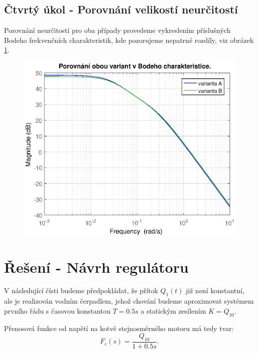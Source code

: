 \documentclass[a4paper,11pt]{article}
\begin{document}
\subsection{Čtvrtý úkol - Porovnání velikostí neurčitostí}
Porovnání neurčitostí pro oba případy provedeme vykreslením příslušných Bodeho frekvenčních charakteristik, kde pozorujeme nepatrné rozdíly, viz obrázek \ref{fig:porovnani_neurcitosti}.
\begin{figure}[htbp]
	\begin{center}
	\includegraphics[scale = 1.0]{obrazky/porovnaniNeurcitosti.eps}
	\label{fig:porovnani_neurcitosti}
	\end{center}
\end{figure}


\newpage
\section{Řešení - Návrh regulátoru}
V následující čísti budeme předpokládat, že přítok $ Q_{1}\left ( t \right ) $ již není konstantní, ale je realizován vodním čerpadlem, jehož chování budeme aproximovat systémem prvního řádu s časovou konstantou $ T=0.5s $ a statickým zesílením $ K = Q_{10} $. 

Přenosová funkce od napětí na kotvě stejnosměrného motoru má tedy tvar:
\begin{equation}\label{eq:Prenos_motoru} 
F_{c}\left ( s \right )=\frac{Q_{10}}{1+0.5s}.
\end{equation}
\end{document}
